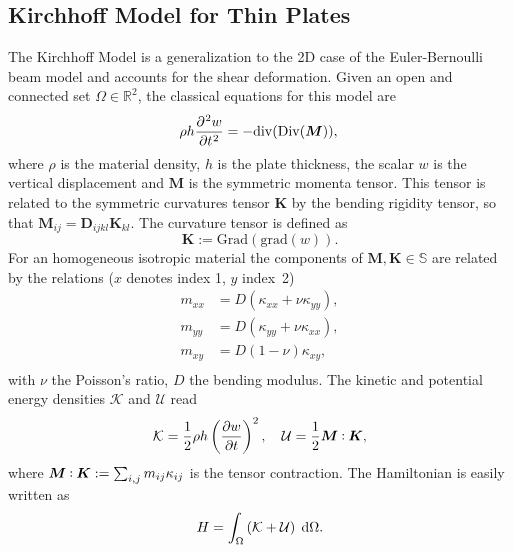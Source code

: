 \documentclass[letterpaper, 10 pt, conference]{ieeeconf}
\def\onedot{$\mathsurround0pt\ldotp$}
\def\cddot{%
	\mathbin{\vcenter{\baselineskip.67ex
			\hbox{\onedot}\hbox{\onedot}}%
}}
\begin{document}
\subsection{Kirchhoff Model for Thin Plates}
\label{subsec:classMin}
The Kirchhoff Model is a generalization to the 2D case of the Euler-Bernoulli beam model and accounts for the shear deformation. Given an open and connected set $\Omega \in \mathbb{R}^2$, the classical equations for this model \cite{timoshenko1959theory} are 
\begin{equation}
\displaystyle \rho h \diffp[2]{w}{t} = -\mathrm{div}(\mathrm{Div}(\bm{M})), \\
\end{equation}
where $\rho$ is the material density, $h$ is the plate thickness, the scalar $w$ is the vertical displacement and $\bm{M}$ is the symmetric momenta tensor.  This tensor is related to the symmetric curvatures tensor $\bm{K}$ by the bending rigidity tensor, so that $\bm{M}_{ij} = \bm{D}_{ijkl} \bm{K}_{kl}$. The curvature tensor is defined as
\begin{equation*}
\bm{K} := \mathrm{Grad}(\mathrm{grad}(w)).
\end{equation*}
For an homogeneous isotropic material the components of $\bm{M}, \bm{K} \in \mathbb{S}$ are related by the relations ($x$ denotes index 1, $y$ index~2)
\begin{equation*}
\begin{aligned}
m_{xx} &= D\left(\kappa_{xx} + \nu \kappa_{yy}\right),\\
m_{yy} &= D\left(\kappa_{yy} + \nu \kappa_{xx}\right),\\
m_{xy} &= D(1 - \nu) \kappa_{xy}, \\
\end{aligned}
\end{equation*}
with $\nu$ the Poisson's ratio, $D$ the bending modulus. The kinetic and potential energy densities $\mathcal{K}$ and $\mathcal{U}$ read
\begin{equation}
\mathcal{K} =  \frac{1}{2}\rho h \left(\diffp{w}{t} \right)^2, \quad
\mathcal{U} = \frac{1}{2} \bm{M} \cddot \bm{K},
\end{equation} 
where $\bm{M} \cddot \bm{K} := \sum_{i,j} m_{ij} \kappa_{ij}$ is the tensor contraction. The Hamiltonian  is easily written as
\begin{equation} 
H = \int_{\Omega} \left( \mathcal{K} + \mathcal{U} \right)   \d\Omega. 
\end{equation}
\end{document}
